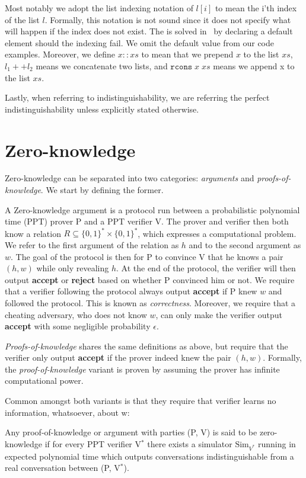 Most notably we adopt the list indexing notation of $l[i]$ to mean the i'th
index of the list $l$. Formally, this notation is not sound since it does not
specify what will happen if the index does not exist. The is solved in \easycrypt\
by declaring a default element should the indexing fail. We omit
the default value from our code examples.
Moreover, we define $x::xs$ to mean that we prepend $x$ to the list $xs$,
$l_{1} ++ l_{2}$ means we concatenate two lists, and $\texttt{rcons} \; x \; xs$ means we
append x to the list $xs$.

Lastly, when referring to indistinguishability, we are referring the perfect
indistinguishability unless explicitly stated otherwise.

\section{Zero-knowledge}
\label{sec:background:zero-knowledge}
Zero-knowledge can be separated into two categories: \textit{arguments} and
\textit{proofs-of-knowledge}. We start by defining the former.

A Zero-knowledge argument is a protocol run between a probabilistic polynomial
time (PPT) prover P and a PPT verifier V. The prover and verifier then both
know a relation $R \subseteq \{0,1\}^{*} \times \{0,1\}^*$, which expresses a
computational problem. We refer to the first argument of the relation as $h$ and
to the second argument as $w$.
The goal of the protocol is then for P to convince V that he knows a pair
$(h,w)$ while only revealing $h$. At the end of the protocol, the verifier will
then output \textbf{accept} or \textbf{reject} based on whether P convinced
him or not.
We require that a verifier following the protocol always output
\textbf{accept} if P knew $w$ and followed the protocol.
This is known as \textit{correctness}.
Moreover, we require that a cheating adversary, who does not know $w$, can
only make the verifier output \textbf{accept} with some negligible probability $\epsilon$.

\textit{Proofs-of-knowledge} shares the same definitions
as above, but require that the verifier only output \textbf{accept} if the
prover indeed knew the pair $(h,w)$. Formally, the \textit{proof-of-knowledge}
variant is proven by assuming the prover has infinite computational power.


Common amongst both variants is that they require that verifier learns no
information, whatsoever, about w:

\begin{definition}
  \label{def:zk}
  Any proof-of-knowledge or argument with parties (P, V) is said to be
  zero-knowledge if for every PPT verifier V$^{*}$ there exists a
  simulator $\text{Sim}_{V^{*}}$ running in expected polynomial time which outputs
  conversations indistinguishable from a real conversation between (P, V$^{*}$).
\end{definition}


